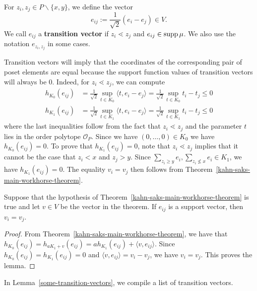 \documentclass{puthesis-UG}
\begin{document}
\begin{defn} \label{transition-vectors}
	For $z_i, z_j \in P \backslash \{x, y\}$, we define the vector 
	\[
		e_{ij} := \frac{1}{\sqrt{2}} (e_i - e_j) \in V.
	\]
	We call $e_{ij}$ a \textbf{transition vector} if $z_i \lessdot z_j$ and $e_{ij} \in \operatorname{supp} \mu$. We also use the notation $e_{z_i, z_j}$ in some cases. 
\end{defn}
Transition vectors will imply that the coordinates of the corresponding pair of poset elements are equal because the support function values of transition vectors will always be $0$. Indeed, for $z_i \lessdot z_j$, we can compute 
\begin{align*}
    h_{K_0}(e_{ij}) & = \frac{1}{\sqrt{2}} \sup_{t \in K_0} \langle t, e_i - e_j \rangle = \frac{1}{\sqrt{2}} \sup_{t \in K_0} t_i - t_j \leq 0 \\
    h_{K_1} (e_{ij}) & = \frac{1}{\sqrt{2}} \sup_{t \in K_1} \langle t, e_i - e_j \rangle  = \frac{1}{\sqrt{2}} \sup_{t \in K_1} t_i - t_j \leq 0
\end{align*}
where the last inequalities follow from the fact that $z_i\lessdot z_j$ and the parameter $t$ lies in the order polytope $\mathcal{O}_P$. Since we have $(0, \ldots, 0) \in K_0$ we have $h_{K_0}(e_{ij}) = 0$. To prove that $h_{K_1}(e_{ij}) = 0$, note that $z_i \lessdot z_j$ implies that it cannot be the case that $z_i < x$ and $z_j > y$. Since $\sum_{z_i \geq y} e_i , \sum_{z_i \not \leq x} e_i \in K_1$, we have $h_{K_1}(e_{ij}) = 0$. The equality $v_i = v_j$ then follows from Theorem~\ref{kahn-saks-main-workhorse-theorem}. 


\begin{cor} \label{transition-vector-implies-equality}
    Suppose that the hypothesis of Theorem~\ref{kahn-saks-main-workhorse-theorem} is true and let $v \in V$ be the vector in the theorem. If $e_{ij}$ is a support vector, then $v_i = v_j$.  
\end{cor}

\begin{proof}
    From Theorem~\ref{kahn-saks-main-workhorse-theorem}, we have that $h_{K_0}(e_{ij}) = h_{aK_1 + v}(e_{ij}) = a h_{K_1} (e_{ij}) + \langle v, e_{ij} \rangle$. Since $h_{K_0}(e_{ij}) = h_{K_1}(e_{ij}) = 0$ and $\langle v, e_{ij} \rangle = v_i - v_j$, we have $v_i = v_j$. This proves the lemma. 
\end{proof}
In Lemma~\ref{some-transition-vectors}, we compile a list of transition vectors. 
\end{document}
